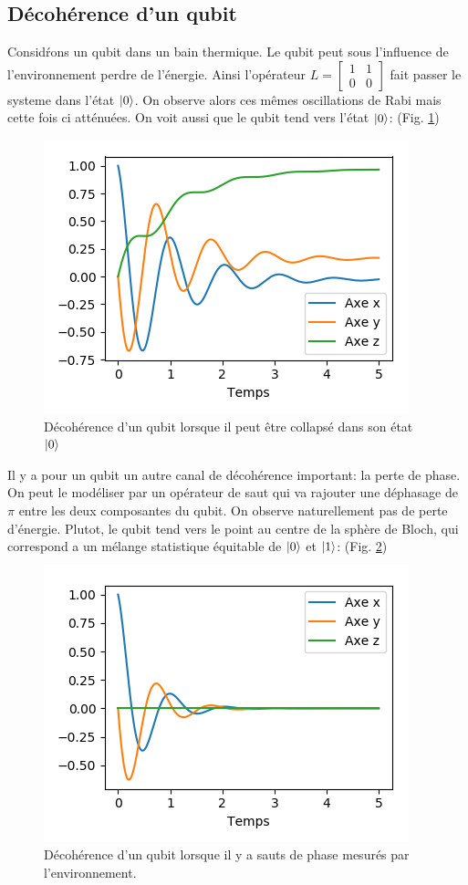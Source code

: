 \documentclass[11pt,a4paper]{article}
\newcommand{\q}{q\hspace{-0.5ex}u}
\begin{document}
	\subsection{Décohérence d'un \q bit}
	Considŕons un \q bit dans un bain thermique. Le \q bit peut sous l'influence de l'environnement perdre de l'énergie. Ainsi l'opérateur $L=\left[\begin{matrix}
	1&1\\0&0
	\end{matrix}\right]$ fait passer le systeme dans l'état $\ket{0}$. On observe alors ces mêmes oscillations de Rabi mais cette fois ci atténuées. On voit aussi que le \q bit tend vers l'état $\ket{0}$: (Fig. \ref{fig:qubit_deco1})
	\begin{figure}
		\centering
		\includegraphics[width=0.7\linewidth]{Qubit_deco1}
		\caption{Décohérence d'un \q bit lorsque il peut être collapsé dans son état $\ket{0}$}
		\label{fig:qubit_deco1}
	\end{figure}
	
	Il y a pour un \q bit un autre canal de décohérence important: la perte de phase. On peut le modéliser par un opérateur de saut qui va rajouter une déphasage de $\pi$ entre les deux composantes du \q bit. On observe naturellement pas de perte d'énergie. Plutot, le \q bit tend vers le point au centre de la sphère de Bloch, qui correspond a un mélange statistique équitable de $\ket{0}$ et $\ket{1}$: (Fig. \ref{fig:qubit_deco2})
	\begin{figure}
		\centering
		\includegraphics[width=0.7\linewidth]{Qubit_deco2}
		\caption{Décohérence d'un \q bit lorsque il y a sauts de phase mesurés par l'environnement.}
		\label{fig:qubit_deco2}
	\end{figure}
	
\end{document}
